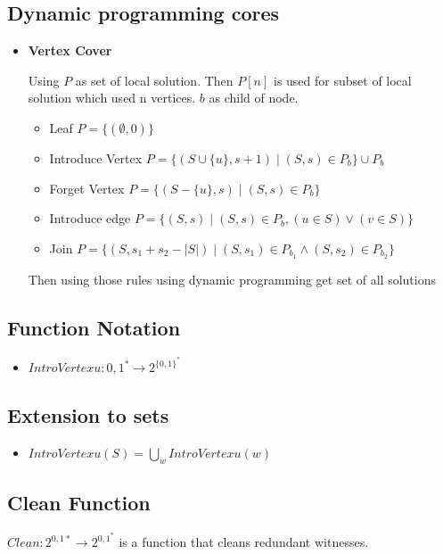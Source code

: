 \subsection{Dynamic programming cores}
\begin{itemize}
\item \textbf{Vertex Cover}

Using $P$ as set of local solution. Then $P[n]$ is used for subset of local solution which used n vertices. $b$ as child of node.
\begin{itemize}
\item Leaf
$P = \{(\emptyset,0)\}$
\item Introduce Vertex
$P = \{(S \cup \{u\}, s + 1) \;|\; (S,s) \in P_b\} \cup P_b$
\item Forget Vertex
$P = \{(S - \{u\}, s) \;|\; (S,s) \in P_b\}$
\item Introduce edge
$P = \{(S,s) \;|\; (S,s) \in P_b, (u \in S) \lor (v \in S) \}$
\item Join
$P = \{(S, s_1 + s_2 - |S|) \;|\; (S, s_1) \in P_{b_1} \land (S, s_2) \in P_{b_2}\}$
\end{itemize}

Then using those rules using dynamic programming get set of all solutions
\end{itemize} 


\subsection{Function Notation}

\begin{itemize}
\item $IntroVertex{u}:{0,1}^*\rightarrow 2^{\{0,1\}^*}$
\end{itemize}


\subsection{Extension to sets}

\begin{itemize}
\item $IntroVertex{u}(S) =  \bigcup_{w} IntroVertex{u}(w)$
\end{itemize}

\subsection{Clean Function}

$Clean:2^{{0,1}*}\rightarrow 2^{{0,1}^*}$ is a function that cleans redundant witnesses. 

